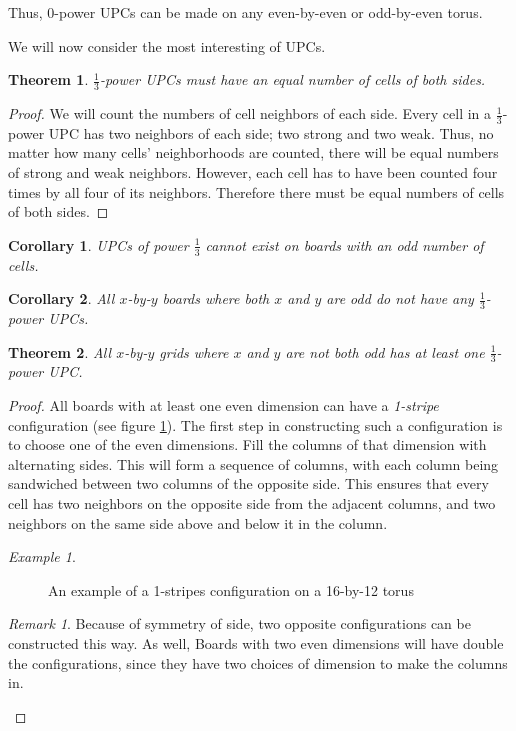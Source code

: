 \documentclass[12pt]{article}
\newtheorem{theorem}{Theorem}%
\newtheorem{corollary}{Corollary}%
\theoremstyle{definition}
\theoremstyle{remark}
\newtheorem{remark}{Remark}%
\theoremstyle{remark}
\newtheorem{example}{Example}%
\begin{document}
\par
Thus, 0-power UPCs can be made on any even-by-even or odd-by-even torus.

\par
We will now consider the most interesting of UPCs. %
\begin{theorem}
\label{13evenThm}
$\frac{1}{3}$-power UPCs must have an equal number of cells of both sides.
\end{theorem}
\begin{proof}
We will count the numbers of cell neighbors of each side. Every cell in a $\frac{1}{3}$-power UPC has two neighbors of each side; two strong and two weak. Thus, no matter how many cells' neighborhoods are counted, there will be equal numbers of strong and weak neighbors. However, each cell has to have been counted four times by all four of its neighbors. Therefore there must be equal numbers of cells of both sides. 

% 
\end{proof}
\begin{corollary}
UPCs of power $\frac{1}{3}$ cannot exist on boards with an odd number of cells.
\end{corollary}
\begin{corollary}
All $x$-by-$y$ boards where both $x$ and $y$ are odd do not have any $\frac{1}{3}$-power UPCs. 
\end{corollary}
\begin{theorem}
All $x$-by-$y$ grids where $x$ and $y$ are not both odd has at least one $\frac{1}{3}$-power UPC.  
\end{theorem}
\begin{proof}
All boards with at least one even dimension can have a \textit{1-stripe} configuration (see figure \ref{3PowStripes}). The first step in constructing such a configuration is to choose one of the even dimensions. Fill the columns of that dimension with alternating sides. This will form a sequence of columns, with each column being sandwiched between two columns of the opposite side. This ensures that every cell has two neighbors on the opposite side from the adjacent columns, and two neighbors on the same side above and below it in the column.
\begin{example}
\begin{figure}
  \centering
  \caption{An example of a 1-stripes configuration on a 16-by-12 torus}
  \label{3PowStripes}
\end{figure}
\begin{remark}
Because of symmetry of side, two opposite configurations can be constructed this way. As well, Boards with two even dimensions will have double the configurations, since they have two choices of dimension to make the columns in. 
\end{remark}
\end{example}
\end{proof}
\end{document}
